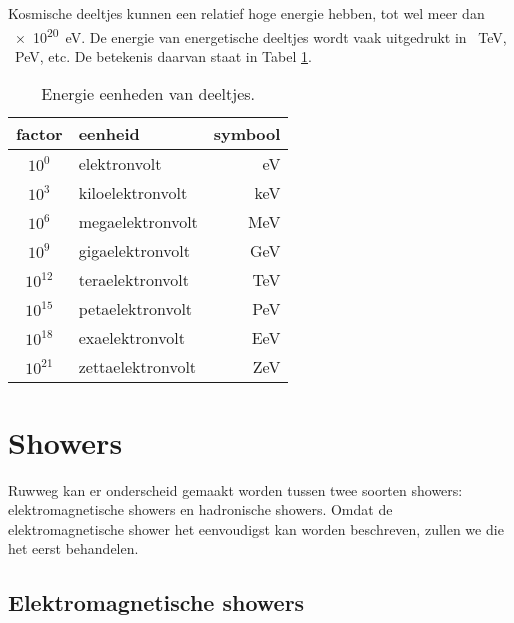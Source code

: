 Kosmische deeltjes kunnen een relatief hoge energie hebben, tot wel meer
dan \SI{e20}{\electronvolt}. De energie van energetische deeltjes wordt
vaak uitgedrukt in \SI{}{\tera\electronvolt}, \SI{}{\peta\electronvolt},
etc. De betekenis daarvan staat in Tabel \ref{eenheden}.

\begin{table}[h]
    \centering
    \begin{tabular}{|c|l|r|} \hline
        factor & eenheid & symbool \\ \hline
        $10^0$ & elektronvolt & eV \\
        $10^3$ & kiloelektronvolt & keV \\
        $10^6$ & megaelektronvolt & MeV \\
        $10^9$ & gigaelektronvolt & GeV \\
        $10^{12}$ & teraelektronvolt & TeV \\
        $10^{15}$ & petaelektronvolt & PeV \\
        $10^{18}$ & exaelektronvolt & EeV \\
        $10^{21}$ & zettaelektronvolt & ZeV \\ \hline
    \end{tabular}
    \caption{Energie eenheden van deeltjes.}
    \label{eenheden}
\end{table}


\section{Showers}

Ruwweg kan er onderscheid gemaakt worden tussen twee soorten showers:
elektromagnetische showers en hadronische showers. Omdat de
elektromagnetische shower het eenvoudigst kan worden beschreven, zullen
we die het eerst behandelen.


\subsection{Elektromagnetische showers}

